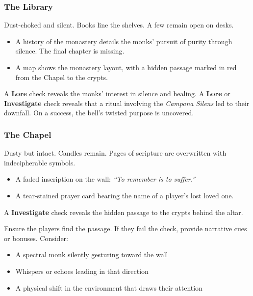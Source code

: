 \subsubsection{The Library}
Dust-choked and silent. Books line the shelves. A few remain open on desks.

\begin{Example}{}
    \begin{itemize}
        \item A history of the monastery details the monks’ pursuit of purity through silence. The final chapter is missing.
        \item A map shows the monastery layout, with a hidden passage marked in red from the Chapel to the crypts.
    \end{itemize}
\end{Example}

A  \textbf{Lore} check reveals the monks' interest in silence and healing. A  \textbf{Lore} or \textbf{Investigate} check reveals that a ritual involving the \emph{Campana Silens} led to their downfall. On a  success, the bell's twisted purpose is uncovered.

\subsubsection{The Chapel}
Dusty but intact. Candles remain. Pages of scripture are overwritten with indecipherable symbols.

\begin{Example}{}
    \begin{itemize}
        \item A faded inscription on the wall: \emph{“To remember is to suffer.”}
        \item A tear-stained prayer card bearing the name of a player’s lost loved one.
    \end{itemize}
\end{Example}

A  \textbf{Investigate} check reveals the hidden passage to the crypts behind the altar.

\begin{GmTips}
    Ensure the players find the passage. If they fail the check, provide narrative cues or bonuses. Consider:
    \begin{itemize}
        \item A spectral monk silently gesturing toward the wall
        \item Whispers or echoes leading in that direction
        \item A physical shift in the environment that draws their attention
    \end{itemize}
\end{GmTips}

